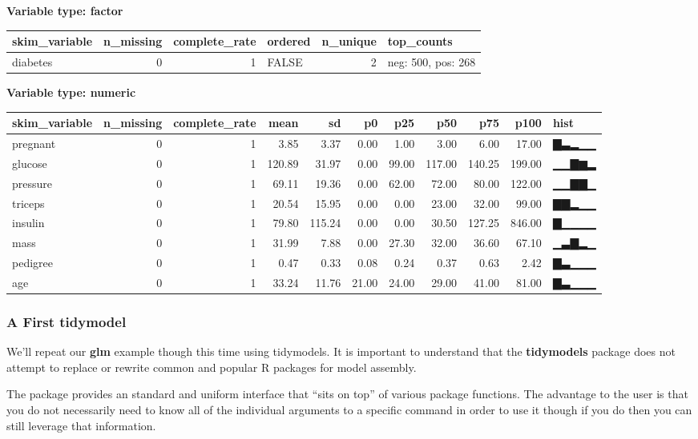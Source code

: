 \documentclass[
]{article}
\begin{document}
\textbf{Variable type: factor}

\begin{longtable}[]{@{}lrrlrl@{}}
\toprule
skim\_variable & n\_missing & complete\_rate & ordered & n\_unique &
top\_counts \\
\midrule
\endhead
diabetes & 0 & 1 & FALSE & 2 & neg: 500, pos: 268 \\
\bottomrule
\end{longtable}

\textbf{Variable type: numeric}

\begin{longtable}[]{@{}lrrrrrrrrrl@{}}
\toprule
skim\_variable & n\_missing & complete\_rate & mean & sd & p0 & p25 &
p50 & p75 & p100 & hist \\
\midrule
\endhead
pregnant & 0 & 1 & 3.85 & 3.37 & 0.00 & 1.00 & 3.00 & 6.00 & 17.00 &
▇▃▂▁▁ \\
glucose & 0 & 1 & 120.89 & 31.97 & 0.00 & 99.00 & 117.00 & 140.25 &
199.00 & ▁▁▇▆▂ \\
pressure & 0 & 1 & 69.11 & 19.36 & 0.00 & 62.00 & 72.00 & 80.00 & 122.00
& ▁▁▇▇▁ \\
triceps & 0 & 1 & 20.54 & 15.95 & 0.00 & 0.00 & 23.00 & 32.00 & 99.00 &
▇▇▂▁▁ \\
insulin & 0 & 1 & 79.80 & 115.24 & 0.00 & 0.00 & 30.50 & 127.25 & 846.00
& ▇▁▁▁▁ \\
mass & 0 & 1 & 31.99 & 7.88 & 0.00 & 27.30 & 32.00 & 36.60 & 67.10 &
▁▃▇▂▁ \\
pedigree & 0 & 1 & 0.47 & 0.33 & 0.08 & 0.24 & 0.37 & 0.63 & 2.42 &
▇▃▁▁▁ \\
age & 0 & 1 & 33.24 & 11.76 & 21.00 & 24.00 & 29.00 & 41.00 & 81.00 &
▇▃▁▁▁ \\
\bottomrule
\end{longtable}

\hypertarget{a-first-tidymodel}{%
\subsubsection{A First tidymodel}\label{a-first-tidymodel}}

We'll repeat our \textbf{glm} example though this time using tidymodels.
It is important to understand that the \textbf{tidymodels} package does
not attempt to replace or rewrite common and popular R packages for
model assembly.

The package provides an standard and uniform interface that ``sits on
top'' of various package functions. The advantage to the user is that
you do not necessarily need to know all of the individual arguments to a
specific command in order to use it though if you do then you can still
leverage that information.
\end{document}
